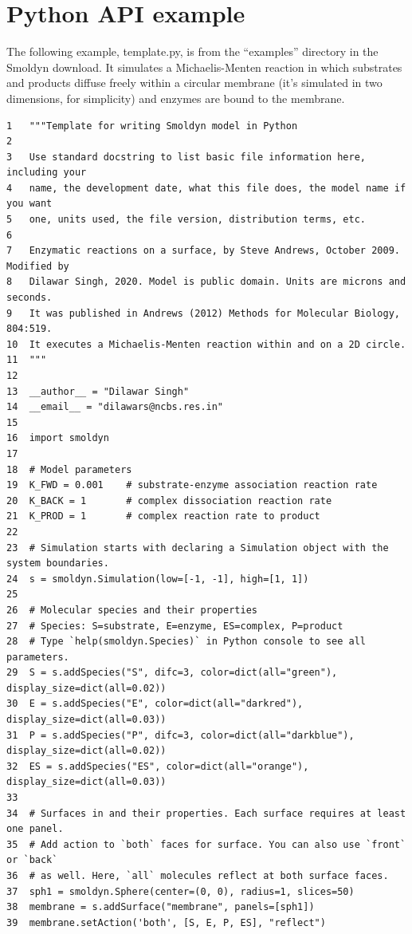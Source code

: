 \documentclass {scrbook}
\begin{document}
\section{Python API example}

The following example, template.py, is from the ``examples'' directory in the Smoldyn download. It simulates a Michaelis-Menten reaction in which substrates and products diffuse freely within a circular membrane (it's simulated in two dimensions, for simplicity) and enzymes are bound to the membrane.

\begin{lstlisting}[style=SSAPython]
1   """Template for writing Smoldyn model in Python
2
3   Use standard docstring to list basic file information here, including your
4   name, the development date, what this file does, the model name if you want
5   one, units used, the file version, distribution terms, etc.
6
7   Enzymatic reactions on a surface, by Steve Andrews, October 2009. Modified by
8   Dilawar Singh, 2020. Model is public domain. Units are microns and seconds.
9   It was published in Andrews (2012) Methods for Molecular Biology, 804:519.
10  It executes a Michaelis-Menten reaction within and on a 2D circle.
11  """
12
13  __author__ = "Dilawar Singh"
14  __email__ = "dilawars@ncbs.res.in"
15
16  import smoldyn
17
18  # Model parameters
19  K_FWD = 0.001    # substrate-enzyme association reaction rate
20  K_BACK = 1       # complex dissociation reaction rate
21  K_PROD = 1       # complex reaction rate to product
22
23  # Simulation starts with declaring a Simulation object with the system boundaries.
24  s = smoldyn.Simulation(low=[-1, -1], high=[1, 1])
25
26  # Molecular species and their properties
27  # Species: S=substrate, E=enzyme, ES=complex, P=product
28  # Type `help(smoldyn.Species)` in Python console to see all parameters.
29  S = s.addSpecies("S", difc=3, color=dict(all="green"), display_size=dict(all=0.02))
30  E = s.addSpecies("E", color=dict(all="darkred"), display_size=dict(all=0.03))
31  P = s.addSpecies("P", difc=3, color=dict(all="darkblue"), display_size=dict(all=0.02))
32  ES = s.addSpecies("ES", color=dict(all="orange"), display_size=dict(all=0.03))
33
34  # Surfaces in and their properties. Each surface requires at least one panel.
35  # Add action to `both` faces for surface. You can also use `front` or `back`
36  # as well. Here, `all` molecules reflect at both surface faces.
37  sph1 = smoldyn.Sphere(center=(0, 0), radius=1, slices=50)
38  membrane = s.addSurface("membrane", panels=[sph1])
39  membrane.setAction('both', [S, E, P, ES], "reflect")

\end{lstlisting}
\end{document}
